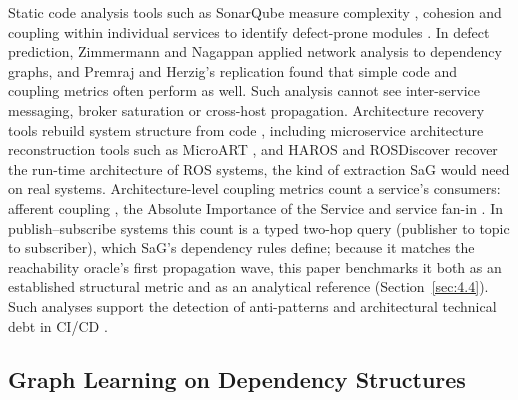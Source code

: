 \documentclass[preprint,3p]{elsarticle}
\begin{document}
Static code analysis tools such as SonarQube \cite{sonarsource2024clean} measure complexity \cite{mccabe1976complexity}, cohesion and coupling \cite{chidamber1994metrics} within individual services to identify defect-prone modules \cite{nagappan2005static,zimmermann2007predicting}. In defect prediction, Zimmermann and Nagappan \cite{zimmermann2008predicting} applied network analysis to dependency graphs, and Premraj and Herzig's replication \cite{premraj2011network} found that simple code and coupling metrics often perform as well. Such analysis cannot see inter-service messaging, broker saturation or cross-host propagation. Architecture recovery tools rebuild system structure from code \cite{bushong2021static}, including microservice architecture reconstruction tools such as MicroART \cite{granchelli2017microart}, and HAROS \cite{santos2019haros} and ROSDiscover \cite{timperley2022rosdiscover} recover the run-time architecture of ROS systems, the kind of extraction SaG would need on real systems. Architecture-level coupling metrics count a service's consumers: afferent coupling \cite{martin2003agile}, the Absolute Importance of the Service \cite{rud2006ais} and service fan-in \cite{bogner2017maintainability}. In publish--subscribe systems this count is a typed two-hop query (publisher to topic to subscriber), which SaG's dependency rules define; because it matches the reachability oracle's first propagation wave, this paper benchmarks it both as an established structural metric and as an analytical reference (Section~\ref{sec:4.4}). Such analyses support the detection of anti-patterns \cite{garcia2009catalogue,taibi2018microservice} and architectural technical debt \cite{li2015technicaldebt} in CI/CD \cite{humble2010continuous}.

\subsection{Graph Learning on Dependency Structures}
\label{sec:2.4}
\end{document}
